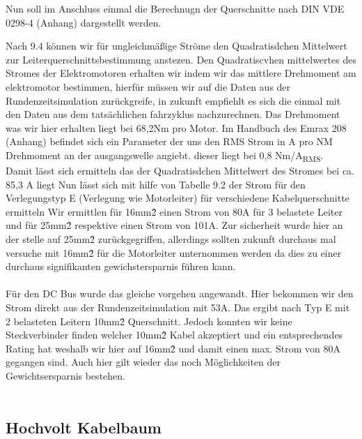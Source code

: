 Nun soll im Anschluss einmal die Berechnugn der Querschnitte nach DIN VDE 0298-4 (Anhang) dargestellt werden.

Nach 9.4 können wir für ungleichmäßige Ströme den Quadratisdchen Mittelwert zur Leiterquerschnittsbestimmung anstezen. Den Quadratiscvhen mittelwertes des Stromes der Elektromotoren erhalten wir indem wir das mittlere Drehmoment am elektromotor bestimmen, hierfür müssen wir auf die Daten aus der Rundenzeitsimulation zurückgreife, in zukunft empfiehlt es sich die einmal mit den Daten aus dem tatsächlichen fahrzyklus nachzurechnen. Das Drehmoment was wir hier erhalten liegt bei 68,2Nm pro Motor. Im Handbuch des Emrax 208 (Anhang) befindet sich ein Parameter der uns den RMS Strom in A pro NM Drehmoment an der ausgangswelle angiebt. dieser liegt bei 0,8 Nm/A\textsubscript{RMS}. \\
Damit lässt sich ermitteln das der Quadratisdchen Mittelwert des Stromes bei ca. 85,3 A liegt
Nun lässt sich mit hilfe von Tabelle 9.2 der Strom für den Verlegungstyp E (Verlegung wie Motorleiter) für verschiedene Kabelquerschnitte ermitteln Wir ermittlen für 16mm\^2 einen Strom von 80A für 3 belastete Leiter und für 25mm\^2 respektive einen Strom von 101A. Zur sicherheit wurde hier an der stelle auf 25mm\^2 zurückgegriffen, allerdings sollten zukunft durchaus mal versuche mit 16mm\^2 für die Motorleiter unternommen werden da dies zu einer durchaus signifikanten gewichstersparnis führen kann.\\
\\
Für den DC Bus wurde das gleiche vorgehen angewandt. Hier bekommen wir den Strom direkt aus der Rundenzeitsimulation mit 53A. Das ergibt nach Typ E mit 2 belasteten Leitern 10mm\^2 Querschnitt. Jedoch konnten wir keine Steckverbinder finden welcher 10mm\^2 Kabel akzeptiert und ein entsprechendes Rating hat weshalb wir hier auf 16mm\^2 und damit einen max. Strom von 80A gegangen sind. Auch hier gilt wieder das noch Möglichkeiten der Gewichtsersparnis bestehen.\\
\\
\subsection{Hochvolt Kabelbaum}

